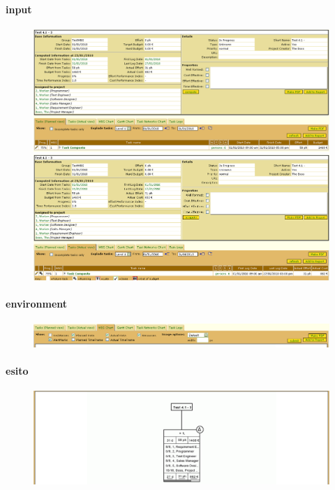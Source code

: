 \paragraph{input}
\begin{figure}
\centering
\includegraphics[width=\textwidth]{tests/TEST_WBS/4.1/4.1_3/Esempio_1/input.png}
\includegraphics[width=\textwidth]{tests/TEST_WBS/4.1/4.1_3/Esempio_1/input_actual.png}
\end{figure}
\paragraph{environment}
\begin{figure}
\centering
\includegraphics[width=\textwidth]{tests/TEST_WBS/4.1/4.1_3/Esempio_1/environment.png}
\end{figure}
\paragraph{esito}
\begin{figure}
\centering
\includegraphics[width=\textwidth]{tests/TEST_WBS/4.1/4.1_3/Esempio_1/output.png}
\end{figure}

